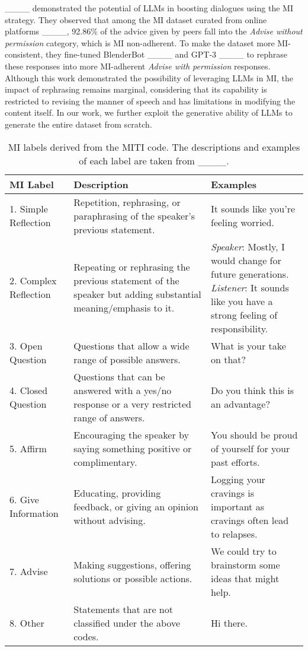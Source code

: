 ____ demonstrated the potential of LLMs in boosting dialogues using the MI strategy. They observed that among the MI dataset curated from online platforms ____, 92.86\% of the advice given by peers fall into the \textit{Advise without permission} category, which is MI non-adherent. To make the dataset more MI-consistent, they fine-tuned BlenderBot ____ and GPT-3 ____ to rephrase these responses into more MI-adherent \textit{Advise with permission} responses. Although this work demonstrated the possibility of leveraging LLMs in MI, the impact of rephrasing remains marginal, considering that its capability is restricted to revising the manner of speech and has limitations in modifying the content itself.
In our work, we further exploit the generative ability of LLMs to generate the entire dataset from scratch.




\begin{table*}[hbt!]
    \begin{center}
    \scriptsize
    \setlength{\tabcolsep}{10pt}
    \renewcommand{\arraystretch}{1.2}
    \begin{tabular}{p{2.2cm}p{6cm}p{5.7cm}}
    \toprule
    \textbf{MI Label} & \textbf{Description}  & \textbf{Examples} \\ 
    \midrule
    1. Simple Reflection & Repetition, rephrasing, or paraphrasing of the speaker’s previous statement. & It sounds like you’re feeling worried. \\
    2. Complex Reflection & Repeating or rephrasing the previous statement of the speaker but adding substantial meaning/emphasis to it. & \parbox[t]{5.6cm}{\textit{Speaker}: Mostly, I would change for future generations.\\ \textit{Listener}: It sounds like you have a strong feeling of responsibility.} \\
    3. Open Question & Questions that allow a wide range of possible answers. & What is your take on that? \\
    4. Closed Question & Questions that can be answered with a yes/no response or a very restricted range of answers. & Do you think this is an advantage? \\
    5. Affirm & Encouraging the speaker by saying something positive or complimentary. & You should be proud of yourself for your past efforts. \\
    6. Give Information & Educating, providing feedback, or giving an opinion without advising. & Logging your cravings is important as cravings often lead to relapses. \\
    7. Advise & Making suggestions, offering solutions or possible actions. & We could try to brainstorm some ideas that might help. \\
    8. Other & Statements that are not classified under the above codes. & Hi there.
     \\
    \bottomrule
    \end{tabular}
    \end{center}
    \caption{MI labels derived from the MITI code. The descriptions and examples of each label are taken from ____.}
    \label{tab:mi_label}
\end{table*}